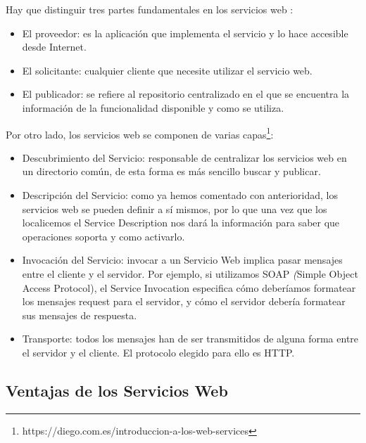 Hay que distinguir tres partes fundamentales en los servicios web \citep{TorresJoaquin2017SC}:
\begin{itemize}
	\item El proveedor: es la aplicación que implementa el servicio y lo hace accesible desde Internet.
	\item El solicitante: cualquier cliente que necesite utilizar el servicio web.
	\item El publicador: se refiere al repositorio centralizado en el que se encuentra la información de la funcionalidad disponible y como se utiliza.
	
\end{itemize}
Por otro lado, los servicios web se componen de varias capas\footnote{https://diego.com.es/introduccion-a-los-web-services}:
\begin{itemize}
	\item Descubrimiento del Servicio: responsable de centralizar los servicios web en un directorio común, de esta forma es más sencillo buscar y publicar.
	\item Descripción del Servicio: como ya hemos comentado con anterioridad, los servicios web se pueden definir a sí mismos, por lo que una vez que los localicemos el Service Description nos dará la información para saber que operaciones soporta y como activarlo.
	\item Invocación del Servicio: invocar a un Servicio Web implica pasar mensajes entre el cliente y el servidor. Por ejemplo, si utilizamos SOAP  \textit({Simple Object Access Protocol}), el Service Invocation especifica cómo deberíamos formatear los mensajes request para el servidor, y cómo el servidor debería formatear sus mensajes de respuesta.
	\item Transporte: todos los mensajes han de ser transmitidos de alguna forma entre el servidor y el cliente. El protocolo elegido para ello es HTTP. 
\end{itemize}



\subsection{Ventajas de los  Servicios Web}
\label{cap:subsec:ventajasserviciosweb}


